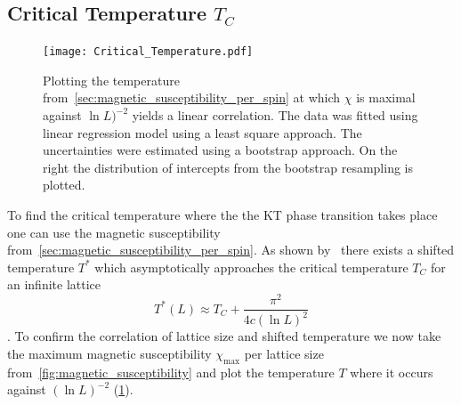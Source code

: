 \subsection{Critical Temperature \texorpdfstring{$T_C$}{T}}\label{sec:critical_temperature}
\begin{figure}
	\centering
	\texttt{[image: Critical\_Temperature.pdf]}
	\caption[Obtaining the critical temperature $\texorpdfstring{T_C}{T}$ by plotting the temperature $\texorpdfstring{T}{T}$ at $\texorpdfstring{\chi_\text{max}}{the magnetic susceptibility is maximum}$ against $\texorpdfstring{(\ln{L})^{-2}}{inverse logarithmic squared lattice size}$]{Plotting the temperature from~\cref{sec:magnetic_susceptibility_per_spin} at which $\chi$ is maximal against $\ln{L})^{-2}$ yields a linear correlation. The data was fitted using linear regression model using a least square approach. The uncertainties were estimated using a bootstrap approach. On the right the distribution of intercepts from the bootstrap resampling is plotted.}
	\label{fig:critical_temperature}
\end{figure}
To find the critical temperature where the the KT phase transition takes place one can use the magnetic susceptibility from~\cref{sec:magnetic_susceptibility_per_spin}. As shown by~\citet{shifted} there exists a shifted temperature $T^*$ which asymptotically approaches the critical temperature $T_C$ for an infinite lattice
\begin{equation}\label{eq:shifted_temperature}
	T^*(L) \approx T_C + \frac{\pi^2}{4c (\ln{L})^2}
\end{equation}
\cite[eq. 3]{shifted}. To confirm the correlation of lattice size and shifted temperature we now take the maximum magnetic susceptibility $\chi_\text{max}$ per lattice size from~\cref{fig:magnetic_susceptibility} and plot the temperature $T$ where it occurs against $(\ln{L})^{-2}$ (\cref{fig:critical_temperature}).

